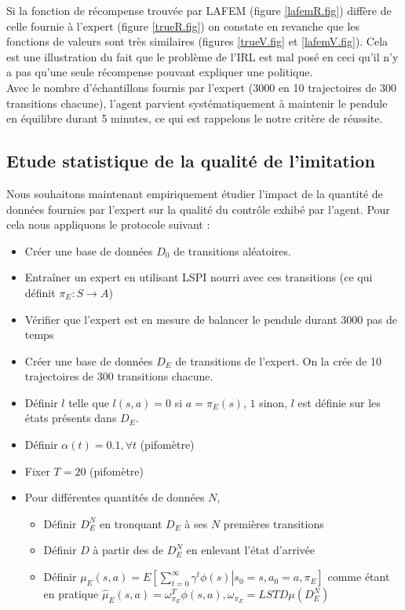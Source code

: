 \documentclass[publibook-draft]{CAp2012}
\begin{document}
{Si la fonction de récompense trouvée par LAFEM (figure \ref{lafemR.fig}) diffère de celle fournie à l'expert (figure \ref{trueR.fig}) on constate en revanche que les fonctions de valeurs sont très similaires (figures \ref{trueV.fig} et \ref{lafemV.fig}). Cela est une illustration du fait que le problème de l'IRL est mal posé en ceci qu'il n'y a pas qu'une seule récompense pouvant expliquer une politique.\\

Avec le nombre d'échantillons fournis par l'expert (3000 en 10 trajectoires de 300 transitions chacune), l'agent parvient systématiquement à maintenir le pendule en équilibre durant 5 minutes, ce qui est rappelons le notre critère de réussite.

\subsection{Etude statistique de la qualité de l'imitation}
Nous souhaitons maintenant empiriquement étudier l'impact de la quantité de données fournies par l'expert sur la qualité du contrôle exhibé par l'agent. Pour cela nous appliquons le protocole suivant :
\begin{itemize}
 \item Créer une base de données $D_0$ de transitions aléatoires.
 \item Entraîner un expert en utilisant LSPI nourri avec ces transitions (ce qui définit $\pi_E : S\rightarrow A$)
 \item Vérifier que l'expert est en mesure de balancer le pendule durant 3000 pas de temps
 \item Créer une base de données $D_E$ de transitions de l'expert. On la crée de 10 trajectoires de 300 transitions chacune.
 \item Définir $l$ telle que $l(s,a) = 0$ si $a=\pi_E(s)$, $1$ sinon, $l$ est définie sur les états présents dans $D_E$.
 \item Définir $\alpha(t) = 0.1,\forall t$ (pifomètre)
 \item Fixer $T=20$ (pifomètre)
 \item Pour différentes quantités de données $N$,
\begin{itemize}
   \item Définir $D_E^N$ en tronquant $D_E$ à ses $N$ premières transitions
   \item Définir $D$ à partir des de $D_E^N$ en enlevant l'état d'arrivée
   \item Définir $\mu_E(s,a) = E\left.\left[\sum\limits_{t=0}^\infty \gamma^t \phi(s)\right|s_0 = s, a_0 = a, \pi_E\right]$ comme étant en pratique $\hat\mu_E(s,a) =  \omega^T_{\pi_E}\phi(s,a), \omega_{\pi_E} = LSTD\mu(D_E^N)$

\end{itemize}
\end{itemize}}
\end{document}
